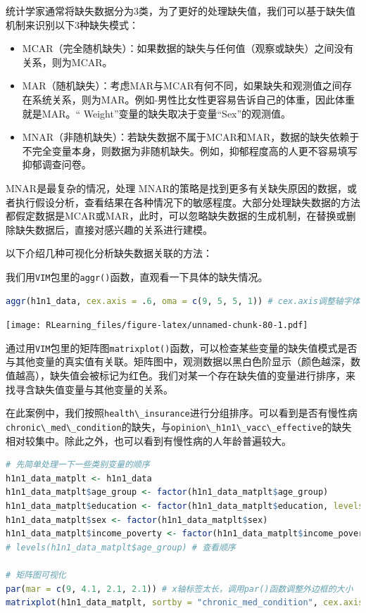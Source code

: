 \documentclass[]{ctexbook}
\providecommand{\tightlist}{%
  \setlength{\itemsep}{0pt}\setlength{\parskip}{0pt}}
\newcommand{\passthrough}[1]{#1}
\begin{document}
统计学家通常将缺失数据分为3类，为了更好的处理缺失值，我们可以基于缺失值机制来识别以下3种缺失模式：

\begin{itemize}
\tightlist
\item
  MCAR（完全随机缺失）：如果数据的缺失与任何值（观察或缺失）之间没有关系，则为MCAR。
\item
  MAR（随机缺失）：考虑MAR与MCAR有何不同，如果缺失和观测值之间存在系统关系，则为MAR。例如-男性比女性更容易告诉自己的体重，因此体重就是MAR。`` Weight''变量的缺失取决于变量``Sex''的观测值。
\item
  MNAR（非随机缺失）：若缺失数据不属于MCAR和MAR，数据的缺失依赖于不完全变量本身，则数据为非随机缺失。例如，抑郁程度高的人更不容易填写抑郁调查问卷。
\end{itemize}

MNAR是最复杂的情况，处理 MNAR的策略是找到更多有关缺失原因的数据，或者执行假设分析，查看结果在各种情况下的敏感程度。大部分处理缺失数据的方法都假定数据是MCAR或MAR，此时，可以忽略缺失数据的生成机制，在替换或删除缺失数据后，直接对感兴趣的关系进行建模。

以下介绍几种可视化分析缺失数据关联的方法：

我们用\passthrough{\lstinline!VIM!}包里的\passthrough{\lstinline!aggr()!}函数，直观看一下具体的缺失情况。

\begin{lstlisting}[language=R]
aggr(h1n1_data, cex.axis = .6, oma = c(9, 5, 5, 1)) # cex.axis调整轴字体大小，oma调整外边框大小
\end{lstlisting}

\texttt{[image: RLearning\_files/figure-latex/unnamed-chunk-80-1.pdf]}

通过用\passthrough{\lstinline!VIM!}包里的矩阵图\passthrough{\lstinline!matrixplot()!}函数，可以检查某些变量的缺失值模式是否与其他变量的真实值有关联。矩阵图中，观测数据以黑白色阶显示（颜色越深，数值越高），缺失值会被标记为红色。我们对某一个存在缺失值的变量进行排序，来找寻含缺失值变量与其他变量的关系。

在此案例中，我们按照\passthrough{\lstinline!health\_insurance!}进行分组排序。可以看到是否有慢性病\passthrough{\lstinline!chronic\_med\_condition!}的缺失，与\passthrough{\lstinline!opinion\_h1n1\_vacc\_effective!}的缺失相对较集中。除此之外，也可以看到有慢性病的人年龄普遍较大。

\begin{lstlisting}[language=R]
# 先简单处理一下一些类别变量的顺序
h1n1_data_matplt <- h1n1_data
h1n1_data_matplt$age_group <- factor(h1n1_data_matplt$age_group)
h1n1_data_matplt$education <- factor(h1n1_data_matplt$education, levels = c("", "< 12 Years", "12 Years", "Some College", "College Graduate"))
h1n1_data_matplt$sex <- factor(h1n1_data_matplt$sex)
h1n1_data_matplt$income_poverty <- factor(h1n1_data_matplt$income_poverty, levels = c("18 - 34 Years", "<= $75,000, Above Poverty", "> $75,000"))
# levels(h1n1_data_matplt$age_group) # 查看顺序

# 矩阵图可视化
par(mar = c(9, 4.1, 2.1, 2.1)) # x轴标签太长，调用par()函数调整外边框的大小
matrixplot(h1n1_data_matplt, sortby = "chronic_med_condition", cex.axis = 0.7) # cex.axis为调整坐标轴字体大小
\end{lstlisting}
\end{document}
